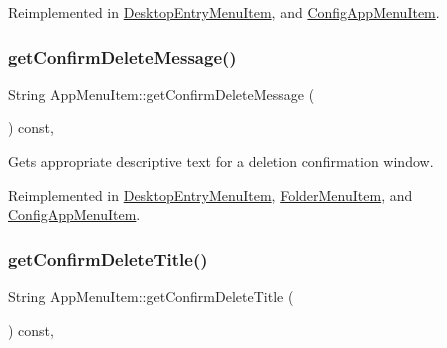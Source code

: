 Reimplemented in \mbox{\hyperlink{classDesktopEntryMenuItem_a544130c3a2984272cd80955dd3c9126d}{Desktop\+Entry\+Menu\+Item}}, and \mbox{\hyperlink{classConfigAppMenuItem_ada51b274c9d790f1bf5f9e84f878f0a4}{Config\+App\+Menu\+Item}}.

\mbox{\label{classAppMenuItem_ac5922f3ac33054ecd54bb3fab692d639}} 
\subsubsection{\texorpdfstring{get\+Confirm\+Delete\+Message()}{getConfirmDeleteMessage()}}
{\footnotesize\ttfamily String App\+Menu\+Item\+::get\+Confirm\+Delete\+Message (\begin{DoxyParamCaption}{ }\end{DoxyParamCaption}) const\hspace{0.3cm}{\ttfamily [protected]}, {\ttfamily [virtual]}}

Gets appropriate descriptive text for a deletion confirmation window. 

Reimplemented in \mbox{\hyperlink{classDesktopEntryMenuItem_ae08d54a981ea02f2fcac9a8aba51e65f}{Desktop\+Entry\+Menu\+Item}}, \mbox{\hyperlink{classFolderMenuItem_ae1961598036e3f731d146257cd556d05}{Folder\+Menu\+Item}}, and \mbox{\hyperlink{classConfigAppMenuItem_a5dd3db4741768d444af41adc11b36cde}{Config\+App\+Menu\+Item}}.

\mbox{\label{classAppMenuItem_a93bd0cf3b4e28d09a4975023b383c1dc}} 
\subsubsection{\texorpdfstring{get\+Confirm\+Delete\+Title()}{getConfirmDeleteTitle()}}
{\footnotesize\ttfamily String App\+Menu\+Item\+::get\+Confirm\+Delete\+Title (\begin{DoxyParamCaption}{ }\end{DoxyParamCaption}) const\hspace{0.3cm}{\ttfamily [protected]}, {\ttfamily [virtual]}}

